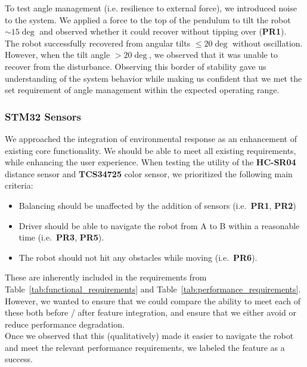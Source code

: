 \documentclass{article}
\begin{document}
\begin{minipage}{\linewidth}
    To test angle management (i.e. resilience to external force), we introduced noise to the system.
    We applied a force to the top of the pendulum to tilt
    the robot $\sim 15 \deg$ and observed whether it could recover without
    tipping over (\textbf{PR1}). \\

    The robot successfully recovered from angular tilts $\leq 20 \deg$
    without oscillation. However, when the tilt angle $> 20 \deg$, we observed that it was
    unable to recover from the disturbance. Observing this border of stability gave us understanding
    of the system behavior while making us confident that we met the set requirement of angle management
    within the expected operating range.\\
\end{minipage}

\subsubsection{STM32 Sensors}

\begin{minipage}{\linewidth}
    We approached the integration of environmental response as an enhancement of existing core functionality.
    We should be able to meet all existing requirements, while enhancing the user experience. When testing the utility of
    the \textbf{HC-SR04} distance sensor and \textbf{TCS34725} color sensor, we prioritized the following main criteria:
    \begin{itemize}
        \item Balancing should be unaffected by the addition of sensors (i.e.~\textbf{PR1}, \textbf{PR2})
        \item Driver should be able to navigate the robot from A to B within a reasonable time (i.e.~\textbf{PR3}, \textbf{PR5}).
        \item The robot should not hit any obstacles while moving (i.e.~\textbf{PR6}).
    \end{itemize}

    These are inherently included in the requirements from Table~\ref{tab:functional_requirements} and Table~\ref{tab:performance_requirements}.
    However, we wanted to ensure that we could compare the ability to meet each of these both before / after feature integration,
    and ensure that we either avoid or reduce performance degradation. \\

    Once we observed that this (qualitatively) made it easier to navigate the robot and meet the relevant performance requirements, we
    labeled the feature as a success. \\
\end{minipage}
\end{document}
